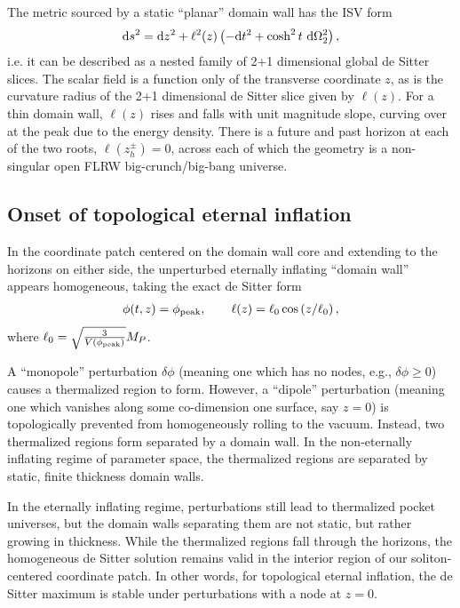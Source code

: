 \documentclass[aps,amsfonts,amsmath,prd,preprint,nofootinbib,superscriptaddress]{revtex4}
\newcommand{\Mp}{{M_{P}}}
\newcommand{\rmd}{{\rm d}}
\begin{document}
\begin{appendix}
The metric sourced by a static ``planar'' domain wall has the ISV \cite{Ipser:1983db, Vilenkin:1984hy} form
\begin{align}
\rmd s^2 = \rmd z^2 + \ell^2(z)\left( -\rmd t^2 + \cosh^2 t~\rmd \Omega_2^2\right),\label{eq:ISVmetric}
\end{align}
i.e. it can be described as a nested family of 2+1 dimensional global de Sitter slices.  The scalar field is a function only of the transverse coordinate $z$, as is the curvature radius of the 2+1 dimensional de Sitter slice
given by $\ell(z)$.  For a thin domain wall, $\ell(z)$ rises and falls with unit magnitude slope, curving over at the peak due to the energy density.  There is a future and past horizon at each of the two roots, $\ell(z_h^\pm) = 0$, across each of which the geometry is a non-singular open FLRW big-crunch/big-bang universe.



\subsection{Onset of topological eternal inflation}
In the coordinate patch centered on the domain wall core and extending to the horizons on either side,
the unperturbed eternally inflating ``domain wall'' appears homogeneous, taking the exact de Sitter form
\begin{align}
\phi(t,z) = \phi_{\rm peak}, \qquad \ell(z) = \ell_0\cos\left(z/\ell_0 \right),
\end{align}
where $\ell_0 = \sqrt{\frac{3}{V(\phi_{\rm peak})}}\Mp$.   

A ``monopole'' perturbation $\delta\phi$ (meaning one which has no nodes, e.g., $\delta\phi \geq 0$) causes a thermalized region to form.  However, a ``dipole'' perturbation
(meaning one which vanishes along some co-dimension one surface, say $z=0$) is topologically prevented from homogeneously rolling to the vacuum.  Instead, two thermalized regions form separated by a domain wall.
In the non-eternally inflating regime of parameter space, the thermalized regions are separated by static, finite thickness domain walls.  

In the eternally inflating regime, perturbations still lead to thermalized pocket universes, but the domain walls separating them are not static, but rather growing in thickness.
While the thermalized regions fall through the horizons, the homogeneous de Sitter solution remains valid in the interior region of our soliton-centered coordinate patch.
In other words, for topological eternal inflation, the de Sitter maximum is stable under perturbations with a node at $z = 0$.  


\end{appendix}
\end{document}
